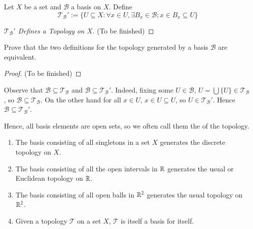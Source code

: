 \begin{definition}
    Let $X$ be a set and $\mathcal{B}$ a basis on $X$. Define \begin{equation*}
        \mathcal{T}_{\mathcal{B}}' := \{U\subseteq X:\forall x \in U,\exists B_x \in \mathcal{B};x \in B_x \subseteq U\}
    \end{equation*}
\end{definition}
\begin{proof}[$\mathcal{T}_{\mathcal{B}}'$ Defines a Topology on $X$]
    (To be finished)
\end{proof}


\begin{exercise}
    Prove that the two definitions for the topology generated by a basis $\mathcal{B}$ are equivalent. 
\end{exercise}
\begin{proof}
    (To be finished)
\end{proof}


\begin{remark}
    Observe that $\mathcal{B} \subseteq \mathcal{T}_{\mathcal{B}}$ and $\mathcal{B} \subseteq \mathcal{T}_{\mathcal{B}}'$. Indeed, fixing some $U \in \mathcal{B}$, $U = \bigcup\{U\} \in \mathcal{T}_{\mathcal{B}}$, so $\mathcal{B} \subseteq \mathcal{T}_{\mathcal{B}}$. On the other hand for all $x \in U$, $x \in U \subseteq U$, so $U \in \mathcal{T}_{\mathcal{B}}'$. Hence $\mathcal{B}\subseteq \mathcal{T}_{\mathcal{B}}'$.

    Hence, all basis elements are open sets, so we often call them the  of the topology.
\end{remark}

\begin{example}
    \leavevmode
    \begin{enumerate}
        \item The basis consisting of all singletons in a set $X$ generates the discrete topology on $X$.
        \item The basis consisting of all the open intervals in $\mathbb R$ generates the usual or Euclidean topology on $\mathbb R$.
        \item The basis consisting of all open balls in $\mathbb R^2$ generates the usual topology on $\mathbb R^2$.
        \item Given a topology $\mathcal{T}$ on a set $X$, $\mathcal{T}$ is itself a basis for itself.
    \end{enumerate}
\end{example}

